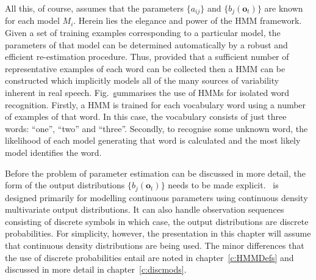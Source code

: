 All this, of course, assumes that the parameters $\{a_{ij}\}$ and
$\{b_{j}(\bm{o}_t)\}$ are known for each model $M_i$.  Herein lies the
elegance and power of the HMM framework.  Given a set of training examples
corresponding to a particular model, the parameters of that model can be
determined automatically by a robust and efficient re-estimation 
procedure.  Thus, provided that a sufficient number of representative
examples of each word can be collected then a HMM can be constructed
which implicitly models all of the many sources of variability inherent
in real speech.  Fig.~\href{f:useforiso} summarises the use of HMMs
for isolated word recognition.  Firstly, a
HMM is trained for each vocabulary word using a number of examples
of that word.  In this case, the vocabulary consists of
just three words: ``one'', ``two'' and ``three''.
Secondly, to recognise some unknown word, the likelihood of 
each model generating that word is calculated and the most likely
model identifies the word.



Before the problem of parameter estimation can be discussed in more
detail, the form of the output distributions $\{b_{j}(\bm{o}_t)\}$
needs to be made explicit. \HTK\ is designed primarily for modelling
continuous parameters using continuous density multivariate output
distributions.  It can also handle observation sequences
consisting of discrete symbols in which case, the output distributions
are discrete probabilities.  For simplicity, however, the presentation 
in this chapter will assume that continuous density 
distributions are being used. The minor differences that the use
of discrete probabilities entail are noted in chapter~\ref{c:HMMDefs}
and discussed in more detail in chapter~\ref{c:discmods}.

